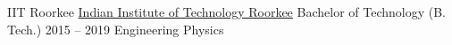 
\timedsubsection
{IIT Roorkee}%
{\href{https://www.iitr.ac.in/}{Indian Institute of Technology Roorkee}}%
{Bachelor of Technology (B. Tech.)}%
{2015 -- 2019}%
{Engineering Physics}%
{\iconNetwork}%

\vspace{-2mm}%